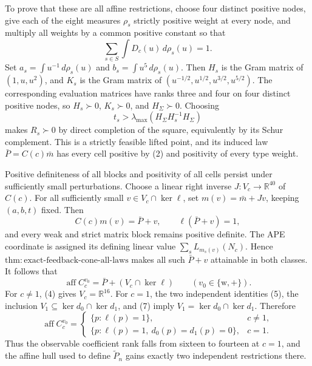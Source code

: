 To prove that these are all affine restrictions, choose four distinct positive nodes, give each of the eight measures \(\rho_s\) strictly positive weight at every node, and multiply all weights by a common positive constant so that
\[
 \sum_{s\in S}\int D_c(u)\,d\rho_s(u)=1. \tag{9}
\]
Set \(a_s=\int u^{-1}\,d\rho_s(u)\) and \(b_s=\int u^5\,d\rho_s(u)\).  Then \(H_s\) is the Gram matrix of \((1,u,u^2)\), and \(K_s\) is the Gram matrix of \((u^{-1/2},u^{1/2},u^{3/2},u^{5/2})\).  The corresponding evaluation matrices have ranks three and four on four distinct positive nodes, so \(H_s\succ0\), \(K_s\succ0\), and \(H_\Sigma\succ0\).  Choosing
\[
 t_s>\lambda_{\max}(H_\Sigma H_s^{-1}H_\Sigma)
\]
makes \(R_s\succ0\) by direct completion of the square, equivalently by its Schur complement.  This is a strictly feasible lifted point, and its induced law \(\bar P=C(c)\bar m\) has every cell positive by (2) and positivity of every type weight.

Positive definiteness of all blocks and positivity of all cells persist under sufficiently small perturbations.  Choose a linear right inverse \(J:V_c\to\mathbb R^{40}\) of \(C(c)\).  For all sufficiently small \(v\in V_c\cap\ker\ell\), set \(m(v)=\bar m+Jv\), keeping \((a,b,t)\) fixed.  Then
\[
 C(c)m(v)=\bar P+v,
 \qquad \ell(\bar P+v)=1,
\]
and every weak and strict matrix block remains positive definite.  The APE coordinate is assigned its defining linear value \(\sum_sL_{m_s(v)}(N_c)\).  Hence \(\mathrm{thm{:}exact\text{-}feedback\text{-}cone\text{-}all\text{-}laws}\) makes all such \(\bar P+v\) attainable in both classes.  It follows that
\[
 \operatorname{aff}C_c^{v_0}=\bar P+(V_c\cap\ker\ell)
 \qquad(v_0\in\{\mathrm w,+\}). \tag{10}
\]
For \(c\ne1\), (4) gives \(V_c=\mathbb R^{16}\).  For \(c=1\), the two independent identities (5), the inclusion \(V_1\subseteq\ker d_0\cap\ker d_1\), and (7) imply \(V_1=\ker d_0\cap\ker d_1\).  Therefore
\[
 \operatorname{aff}C_c^{v_0}=
 \begin{cases}
 \{p:\ell(p)=1\},&c\ne1,\\
 \{p:\ell(p)=1,\ d_0(p)=d_1(p)=0\},&c=1.
 \end{cases} \tag{11}
\]
Thus the observable coefficient rank falls from sixteen to fourteen at \(c=1\), and the affine hull used to define \(\widetilde P_n\) gains exactly two independent restrictions there.
